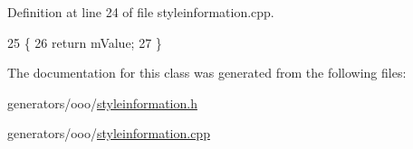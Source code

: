 Definition at line 24 of file styleinformation.\+cpp.


\begin{DoxyCode}
25 \{
26   \textcolor{keywordflow}{return} mValue;
27 \}
\end{DoxyCode}


The documentation for this class was generated from the following files\+:\begin{DoxyCompactItemize}
\item 
generators/ooo/\hyperlink{styleinformation_8h}{styleinformation.\+h}\item 
generators/ooo/\hyperlink{styleinformation_8cpp}{styleinformation.\+cpp}\end{DoxyCompactItemize}

